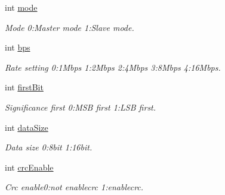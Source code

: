 \begin{DoxyCompactItemize}
\item 
\mbox{\label{struct_p_v_s_d_k___m_o_u_n_t_a_p_i___s_p_i___p_a_r_a_m_ad9dc19c9a6f1ac9fe4ce629b609fc6b5}} 
int \hyperlink{struct_p_v_s_d_k___m_o_u_n_t_a_p_i___s_p_i___p_a_r_a_m_ad9dc19c9a6f1ac9fe4ce629b609fc6b5}{mode}
\begin{DoxyCompactList}\small\item\em Mode 0\+:Master mode 1\+:Slave mode. \end{DoxyCompactList}\item 
\mbox{\label{struct_p_v_s_d_k___m_o_u_n_t_a_p_i___s_p_i___p_a_r_a_m_a948623a0d1a925544e48fc64e6c3ace2}} 
int \hyperlink{struct_p_v_s_d_k___m_o_u_n_t_a_p_i___s_p_i___p_a_r_a_m_a948623a0d1a925544e48fc64e6c3ace2}{bps}
\begin{DoxyCompactList}\small\item\em Rate setting 0\+:1\+Mbps 1\+:2\+Mbps 2\+:4\+Mbps 3\+:8\+Mbps 4\+:16\+Mbps. \end{DoxyCompactList}\item 
\mbox{\label{struct_p_v_s_d_k___m_o_u_n_t_a_p_i___s_p_i___p_a_r_a_m_aebfc3e3335c7d66317e3cf0ef75791c5}} 
int \hyperlink{struct_p_v_s_d_k___m_o_u_n_t_a_p_i___s_p_i___p_a_r_a_m_aebfc3e3335c7d66317e3cf0ef75791c5}{first\+Bit}
\begin{DoxyCompactList}\small\item\em Significance first 0\+:M\+SB first 1\+:L\+SB first. \end{DoxyCompactList}\item 
\mbox{\label{struct_p_v_s_d_k___m_o_u_n_t_a_p_i___s_p_i___p_a_r_a_m_a9aa6df568178f93b5d7e65ccea3b4d2c}} 
int \hyperlink{struct_p_v_s_d_k___m_o_u_n_t_a_p_i___s_p_i___p_a_r_a_m_a9aa6df568178f93b5d7e65ccea3b4d2c}{data\+Size}
\begin{DoxyCompactList}\small\item\em Data size 0\+:8bit 1\+:16bit. \end{DoxyCompactList}\item 
\mbox{\label{struct_p_v_s_d_k___m_o_u_n_t_a_p_i___s_p_i___p_a_r_a_m_afd278ab114519f1d2285046820631eb7}} 
int \hyperlink{struct_p_v_s_d_k___m_o_u_n_t_a_p_i___s_p_i___p_a_r_a_m_afd278ab114519f1d2285046820631eb7}{crc\+Enable}
\begin{DoxyCompactList}\small\item\em Crc enable0\+:not enablecrc 1\+:enablecrc. \end{DoxyCompactList}\end{DoxyCompactItemize}



